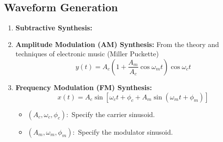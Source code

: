 \documentclass[12pt]{article}
\begin{document}
\subsection{Waveform Generation}
\begin{enumerate}
    \item \textbf{Subtractive Synthesis:}
    \item \textbf{Amplitude Modulation (AM) Synthesis:}
    From the theory and techniques of electronic music (Miller Puckette)
    \begin{equation}
        y(t) = A_c \left( 1 + \frac{A_m}{A_c} \cos \omega_m t \right) \cos \omega_c t
    \end{equation}

    \item \textbf{Frequency Modulation (FM) Synthesis:}
    \begin{equation}
        x(t) = A_c \sin \left[ \omega_c t + \phi_c + A_m \sin(\omega_m t + \phi_m) \right]
    \end{equation}
    
    \begin{itemize}
        \item $(A_c, \omega_c, \phi_c):$ Specify the carrier sinusoid.
        \item $(A_m, \omega_m, \phi_m):$ Specify the modulator sinusoid.
    \end{itemize}
\end{enumerate}
\end{document}
